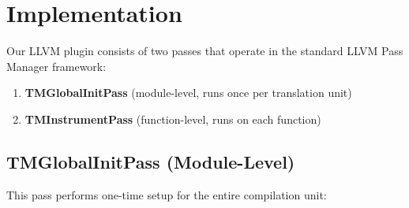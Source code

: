 \documentclass[article,12pt]{article}
\begin{document}
\section{Implementation}\label{sec:implementation}

Our LLVM plugin consists of two passes that operate in the standard LLVM Pass Manager
framework:

\begin{enumerate}
\item \textbf{TMGlobalInitPass} (module-level, runs once per translation unit)
\item \textbf{TMInstrumentPass} (function-level, runs on each function)
\end{enumerate}

\subsection{TMGlobalInitPass (Module-Level)}

This pass performs one-time setup for the entire compilation unit:
\end{document}
